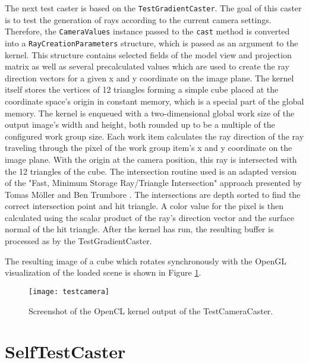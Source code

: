 The next test caster is based on the \lstinline!TestGradientCaster!. The goal of this caster is to test the generation of rays according to the current camera settings. Therefore, the \lstinline!CameraValues! instance passed to the \lstinline!cast! method is converted into a \lstinline!RayCreationParameters! structure, which is passed as an argument to the kernel. This structure contains selected fields of the model view and projection matrix as well as several precalculated values which are used to create the ray direction vectors for a given x and y coordinate on the image plane. The kernel itself stores the vertices of 12 triangles forming a simple cube placed at the coordinate space's origin in constant memory, which is a special part of the global memory. The kernel is enqueued with a two-dimensional global work size of the output image's width and height, both rounded up to be a multiple of the configured work group size. Each work item calculates the ray direction of the ray traveling through the pixel of the work group item's x and y coordinate on the image plane. With the origin at the camera position, this ray is intersected with the 12 triangles of the cube. The intersection routine used is an adapted version of the "Fast, Minimum Storage Ray/Triangle Intersection" approach presented by Tomas Möller and Ben Trumbore \cite{triangle_intersection}. The intersections are depth sorted to find the correct intersection point and hit triangle. A color value for the pixel is then calculated using the scalar product of the ray's direction vector and the surface normal of the hit triangle. After the kernel has run, the resulting buffer is processed as by the TestGradientCaster.


The resulting image of a cube which rotates synchronously with the OpenGL visualization of the loaded scene is shown in Figure \ref{fig:testcamera}.

\begin{figure}[h]
\centering
\texttt{[image: testcamera]}
\caption{Screenshot of the OpenCL kernel output of the TestCameraCaster.}
\label{fig:testcamera}
\end{figure}


\section{SelfTestCaster}

